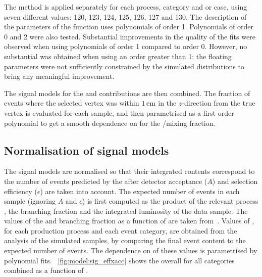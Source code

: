 The \SSF method is applied separately for each process, category and \RV or \WV case, using seven different \mH values: 120, 123, 124, 125, 126, 127 and 130\GeV. The description of the parameters of the \DCBpG function uses polynomials of order 1. Polynomials of order 0 and 2 were also tested. Substantial improvements in the quality of the fits were observed when using polynomials of order 1 compared to order 0. However, no substantial was obtained when using an order greater than 1: the floating parameters were not sufficiently constrained by the simulated \mgg distributions to bring any meaningful improvement.

The signal models for the \RV and \WV contributions are then combined. %
The fraction of events where the selected vertex was within $1\,\text{cm}$ in the $z$-direction from the true vertex is evaluated for each \mH sample, and then parametrised as a first order polynomial to get a smooth dependence on \mH for the \RV/\WV mixing fraction.


\subsection{Normalisation of signal models}

The signal models are normalised so that their integrated contents correspond to the number of events predicted by the \SM after detector acceptance ($A$) and selection efficiency ($\epsilon$) are taken into account. The expected number of events in each sample (ignoring $A$ and $\epsilon$) is first computed as the product of the relevant process \crosssection, the \Hgg branching fraction and the integrated luminosity of the data sample. The values of the \crosssection\s and branching fraction as a function of \mH are taken from~\cite{LHCHXSWGYR4}. 
Values of \effxacc, for each production process and each event category, are obtained from the analysis of the simulated samples, by comparing the final event content to the expected number of events.
The dependence on \mH of these values is parametrised by polynomial fits.
\Fig~\ref{fig:model:sig_effxacc} shows the overall \effxacc for all categories combined as a function of \mH.


